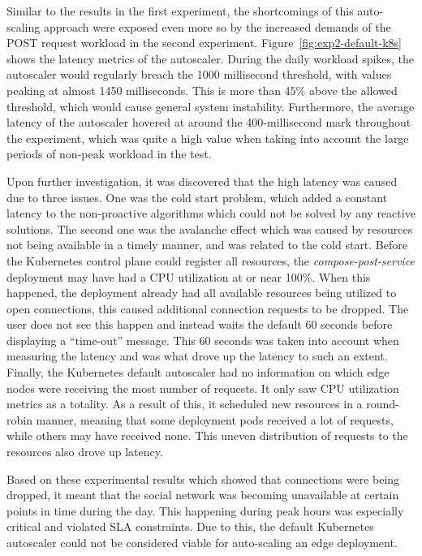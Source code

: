 Similar to the results in the first experiment, the shortcomings of this auto-scaling approach were exposed even more so by the increased demands of the POST request workload in the second experiment. Figure~\ref{fig:exp2-default-k8s} shows the latency metrics of the autoscaler. During the daily workload spikes, the autoscaler would regularly breach the 1000 millisecond threshold, with values peaking at almost 1450 milliseconds. This is more than 45\% above the allowed threshold, which would cause general system instability. Furthermore, the average latency of the autoscaler hovered at around the 400-millisecond mark throughout the experiment, which was quite a high value when taking into account the large periods of non-peak workload in the test.\par

Upon further investigation, it was discovered that the high latency was caused due to three issues. One was the cold start problem, which added a constant latency to the non-proactive algorithms which could not be solved by any reactive solutions. The second one was the avalanche effect which was caused by resources not being available in a timely manner, and was related to the cold start. Before the Kubernetes control plane could register all resources, the \textit{compose-post-service} deployment may have had a CPU utilization at or near 100\%. When this happened, the deployment already had all available resources being utilized to open connections, this caused additional connection requests to be dropped. The user does not see this happen and instead waits the default 60 seconds before displaying a ``time-out'' message. This 60 seconds was taken into account when measuring the latency and was what drove up the latency to such an extent. Finally, the Kubernetes default autoscaler had no information on which edge nodes were receiving the most number of requests. It only saw CPU utilization metrics as a totality. As a result of this, it scheduled new resources in a round-robin manner, meaning that some deployment pods received a lot of requests, while others may have received none. This uneven distribution of requests to the resources also drove up latency.\par

Based on these experimental results which showed that connections were being dropped, it meant that the social network was becoming unavailable at certain points in time during the day. This happening during peak hours was especially critical and violated SLA constraints. Due to this, the default Kubernetes autoscaler could not be considered viable for auto-scaling an edge deployment.


